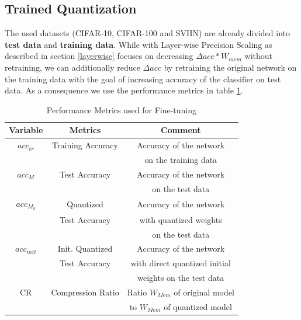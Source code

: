\subsection{Trained Quantization}
The used datasets (CIFAR-10, CIFAR-100 and SVHN) are already divided into \textbf{test data} and \textbf{training data}. While with Layer-wise Precision Scaling as described in section \ref{layerwise} focuses on decreasing $\Delta acc * W_{mem}$ without retraining, we can additionally reduce $\Delta acc$ by retraining the original network on the training data with the goal of increasing accuracy of the classifier on test data. As a consequence we use the performance metrics in table \ref{tab:metrics}.
\begin{table}[ht!]
  \caption{Performance Metrics used for Fine-tuning}
  \label{tab:metrics}
  \begin{tabular}{ccc}
    \toprule
    	\textbf{Variable}&\textbf{Metrics}&\textbf{Comment}\\
    \midrule
 		$acc_{tr}$&Training Accuracy& Accuracy of the network\\
 		&&  on the training data\\
		$acc_M$&Test Accuracy & Accuracy of the  network \\
 		&&  on the test data\\
		$acc_{M_q}$&Quantized & Accuracy of the network \\
		&Test Accuracy\footnotemark& with quantized weights\\
		&& on the test data\\
		$acc_{init}$&Init. Quantized & Accuracy of the network \\
		&Test Accuracy& with direct quantized initial\\
		&&weights on the test data\\
		CR& Compression Ratio & Ratio $W_{Mem}$ of original model\\
		& & to $W_{Mem}$ of quantized model\\
  	\bottomrule
\end{tabular}
\end{table}


